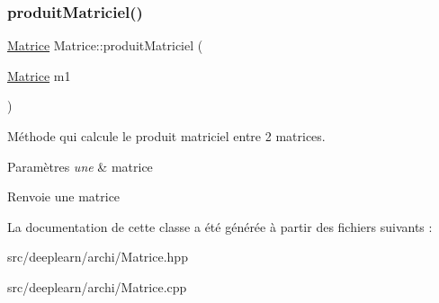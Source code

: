 \subsubsection{\texorpdfstring{produit\+Matriciel()}{produitMatriciel()}}
{\footnotesize\ttfamily \hyperlink{class_matrice}{Matrice} Matrice\+::produit\+Matriciel (\begin{DoxyParamCaption}\item[{\hyperlink{class_matrice}{Matrice}}]{m1 }\end{DoxyParamCaption})}



Méthode qui calcule le produit matriciel entre 2 matrices. 


\begin{DoxyParams}{Paramètres}
{\em une} & matrice \\
\hline
\end{DoxyParams}
\begin{DoxyReturn}{Renvoie}
une matrice 
\end{DoxyReturn}


La documentation de cette classe a été générée à partir des fichiers suivants \+:\begin{DoxyCompactItemize}
\item 
src/deeplearn/archi/Matrice.\+hpp\item 
src/deeplearn/archi/Matrice.\+cpp\end{DoxyCompactItemize}
